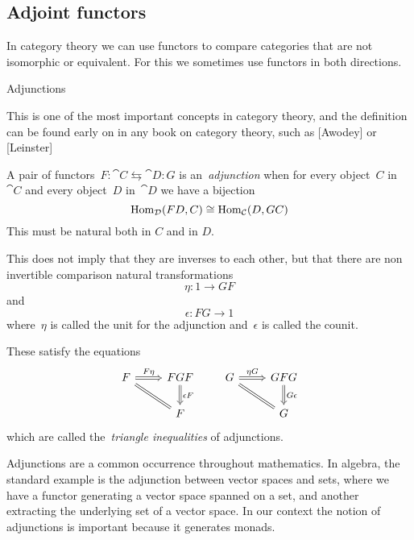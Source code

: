 \documentclass[../TFG.tex]{subfiles}
\begin{document}
\subsection{Adjoint functors}
In category theory we can use functors to compare categories that are not
isomorphic or equivalent. For this we sometimes use functors in both directions.

Adjunctions

This is one of the most important concepts in category theory, and
the definition can be found early on in any book on category theory,
such as [Awodey] or [Leinster]


\begin{definition}[Adjunction]
A pair of functors~\(F:\cat{C}\leftrightarrows\cat{D}:G\) is
an~\emph{adjunction} when for every object~\(C\) in~\(\cat{C}\) and every
object~\(D\) in~\(\cat{D}\) we have a bijection
\[
    \operatorname{Hom}_{\mathcal{D}}(FD, C) \cong \operatorname{Hom}_{\mathcal{C}}(D, GC)
\]
This must be natural both in $C$ and in $D$.
\end{definition}

This does not imply that they are inverses to each other, but that there are non
invertible comparison natural transformations
\[
    \eta:1\longrightarrow GF
\]
and
\[
    \epsilon:FG\longrightarrow 1
\]
where~\(\eta\) is called the unit for the adjunction and~\(\epsilon\) is called
the counit.

These satisfy the equations
\[
    \begin{tikzcd}
        F \arrow[r, "F\eta", Rightarrow] \arrow[dr, equal] & FGF \arrow[d, "\epsilon F", Rightarrow] \\
                                                               & F
    \end{tikzcd}
    \qquad
    \begin{tikzcd}
        G \arrow[r, "\eta G", Rightarrow] \arrow[dr, equal] & GFG \arrow[d, "G\epsilon", Rightarrow] \\
                                                                & G
    \end{tikzcd}
\]
which are called the~\emph{triangle inequalities} of adjunctions.

Adjunctions are a common occurrence throughout mathematics. In algebra, the
standard example is the adjunction between vector spaces and sets, where we have
a functor generating a vector space spanned on a set, and another extracting the
underlying set of a vector space. In our context the notion of adjunctions is
important because it generates monads.
\end{document}
